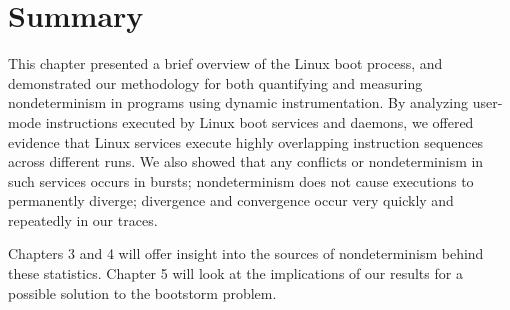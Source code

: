 \newpage \section{Summary}
This chapter presented a brief overview of the Linux boot process,
and demonstrated our methodology for both quantifying and measuring nondeterminism
in programs using dynamic instrumentation. By analyzing user-mode
instructions executed by Linux boot services and daemons, we offered
evidence that Linux services execute highly overlapping instruction
sequences across different runs. We also showed
that any conflicts or nondeterminism in such services occurs in bursts;
nondeterminism does not cause executions to permanently diverge;
divergence and convergence occur very quickly and repeatedly in our
traces.

Chapters 3 and 4 will offer insight into the sources 
of nondeterminism behind these statistics. 
Chapter 5 will look at the implications of our results for a possible
solution to the bootstorm problem.

